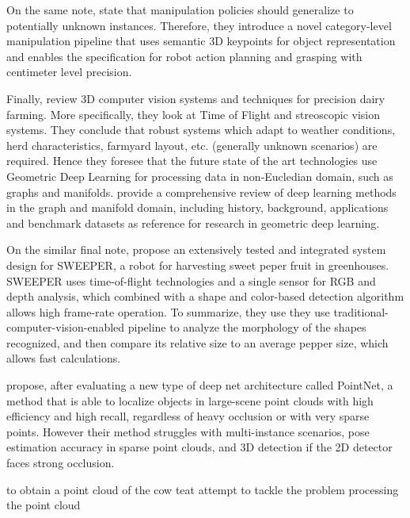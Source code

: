 On the same note, \textcite{manuelli2019kpam} state that manipulation policies should generalize to potentially unknown instances. Therefore, they introduce a novel category-level manipulation pipeline that uses semantic 3D keypoints for object representation and enables the specification for robot action planning and grasping with centimeter level precision. 

Finally, \textcite{o20193d} review 3D computer vision systems and techniques for precision dairy farming. More specifically, they look at Time of Flight and streoscopic vision systems. They conclude that robust systems which adapt to weather conditions, herd characteristics, farmyard layout, etc. (generally unknown scenarios) are required. Hence they foresee that the future state of the art technologies use Geometric Deep Learning for processing data in non-Eucledian domain, such as graphs and manifolds. \textcite{cao2020comprehensive} provide a comprehensive review of deep learning methods in the graph and manifold domain, including history, background, applications and benchmark datasets as reference for research in geometric deep learning.

On the similar final note, \textcite{arad2020development} propose an extensively tested and integrated system design for SWEEPER, a robot for harvesting sweet peper fruit in greenhouses. SWEEPER uses time-of-flight technologies and a single sensor for RGB and depth analysis, which combined with a shape and color-based detection algorithm allows high frame-rate operation. To summarize, they use they use traditional-computer-vision-enabled pipeline to analyze the morphology of the shapes recognized, and then compare its relative size to an average pepper size, which allows fast calculations. 


\textcite{qi2018frustum} propose, after evaluating a new type of deep net architecture called PointNet\cite{qi2017pointnet}\cite{qi2017pointnet++}, a method that is able to localize objects in large-scene point clouds with high efficiency and high recall, regardless of heavy occlusion or with very sparse points. However their method struggles with multi-instance scenarios, pose estimation accuracy in sparse point clouds, and 3D detection if the 2D detector faces strong occlusion.

to obtain a point cloud of the cow teat  attempt to tackle the problem processing the point cloud 


